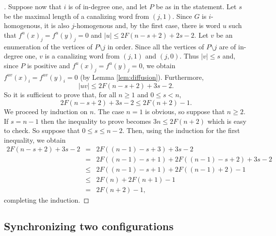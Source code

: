 \documentclass[11pt,letter]{article}
\newcommand{\BF}[1]{{{\boldmath{\bf #1}\unboldmath}}}
\begin{document}
\begin{proof}[{\BF{Proof of Lemma~\ref{lem:fixing_a_vertex}}}]
\medskip
Suppose now that $i$ is of in-degree one, and let $P$ be as in the statement. Let $s$ be the maximal length of a canalizing word from $(j,1)$. Since $G$ is $i$-homogenous, it is also $j$-homogenous and, by the first case, there is word $u$ such that $f^u(x)_j=f^u(y)_j=0$ and $|u|\leq 2F(n-s+2)+2s-2$. Let $v$ be an enumeration of the vertices of $P\setminus j$ in order. Since all the vertices of $P\setminus j$ are of in-degree one, $v$ is a canalizing word from $(j,1)$ and $(j,0)$. Thus $|v|\leq s$ and, since $P$ is positive and $f^u(x)_j=f^u(y)_j=0$, we obtain $f^{uv}(x)_i=f^{uv}(y)_i=0$ (by Lemma \ref{lem:diffusion}). Furthermore, 
\[
|uv|\leq 2F(n-s+2)+3s-2.
\]
So it is sufficient to prove that, for all $n\geq 1$ and $0\leq s<n$, 
\[
2F(n-s+2)+3s-2\leq 2F(n+2)-1.
\]
We proceed by induction on $n$. The case $n=1$ is obvious, so suppose that $n\geq 2$. If $s=n-1$ then the inequality to prove becomes $3n\leq 2F(n+2)$ which is easy to check. So suppose that $0\leq s\leq n-2$. Then, using the induction for the first inequality, we obtain
\[
\begin{array}{lll}
2F(n-s+2)+3s-2
&=&2F((n-1)-s+3)+3s-2\\
&=&2F((n-1)-s+1)+2F((n-1)-s+2)+3s-2\\
&\leq & 2F((n-1)-s+1)+2F((n-1)+2)-1\\
&\leq & 2F(n)+2F(n+1)-1\\
&= & 2F(n+2)-1,
\end{array}
\]
completing the induction. 
\end{proof}

\subsection{Synchronizing two configurations}
\end{document}
